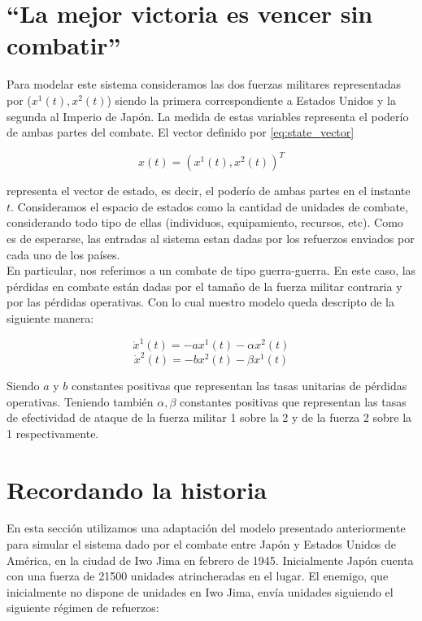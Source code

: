 \documentclass{sig-alternate}
\begin{document}
\section{``La mejor victoria es vencer sin combatir''}
\label{sec:allyourbasearebelongtous}
Para modelar este sistema consideramos las dos fuerzas militares representadas por ($x^1(t), x^2(t)$) siendo la primera correspondiente a Estados
Unidos y la segunda al Imperio de Japón. La medida de estas variables representa el poderío de ambas partes del combate. 
El vector definido por \eqref{eq:state_vector}

\begin{equation}
x(t) = ( x^1(t), x^2(t) )^T \label{eq:state_vector}
\end{equation}

representa el vector de estado, es decir, el poderío de ambas partes en el instante $t$. Consideramos el espacio de estados como la cantidad de 
unidades de combate, considerando todo tipo de ellas (individuos, equipamiento, recursos, etc). Como es de esperarse, las entradas al sistema estan 
dadas por los refuerzos enviados por cada uno de los países.\\
En particular, nos referimos a un combate de tipo guerra-guerra.
En este caso, las pérdidas en combate están dadas por el tamaño de la fuerza militar contraria y por las pérdidas operativas. Con lo cual nuestro modelo queda descripto de la siguiente manera:

\begin{equation}
\dot{x}^1(t) = -ax^1(t) - \alpha x^2(t)\end{equation}
\begin{equation}
\dot{x}^2(t) = -bx^2(t) - \beta x^1(t)\end{equation}

Siendo $a$ y $b$ constantes positivas que representan las tasas unitarias de pérdidas operativas. Teniendo también $\alpha, \beta$ 
constantes positivas que representan las tasas de efectividad de ataque de la fuerza militar 1 sobre la 2 y de la fuerza 2 sobre la 1 respectivamente.

\section{Recordando la historia}
\label{sec:remember}
En esta sección utilizamos una adaptación del modelo presentado anteriormente para simular el sistema dado por el combate entre Japón y 
Estados Unidos de América, en la ciudad de Iwo Jima en febrero de 1945. Inicialmente Japón cuenta con una fuerza de 21500 unidades 
atrincheradas en el lugar. El enemigo, que inicialmente no dispone de unidades en Iwo Jima, envía unidades siguiendo el siguiente 
régimen de refuerzos:
\end{document}
